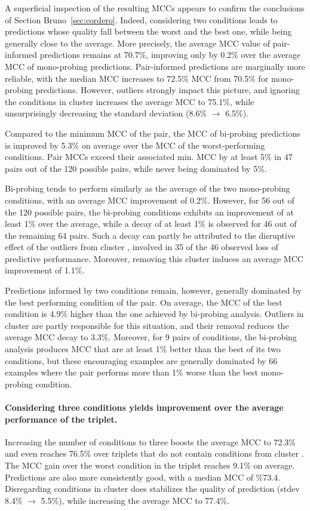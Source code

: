 \documentclass[a4,center,fleqn]{NAR}
\begin{document}
A superficial inspection of the resulting MCCs appears to confirm the conclusions of Section Bruno~\ref{sec:cordero}. Indeed, considering two conditions leads to predictions whose quality fall between the worst and the best one, while being generally close to the average. More precisely, the average MCC value of pair-informed predictions remains at 70.7\%, improving only by 0.2\% over the average MCC of mono-probing predictions. Pair-informed predictions are marginally more reliable, with the median MCC increases to 72.5\% MCC from 70.5\% for mono-probing predictions. However, outliers strongly impact this picture, and ignoring the conditions in cluster  increases the average MCC to 75.1\%, while unsurprisingly decreasing the standard deviation (8.6\% $\to$ 6.5\%).

Compared to the minimum MCC of the pair, the MCC of bi-probing predictions is improved by 5.3\% on average over the MCC of the worst-performing conditions. Pair MCCs exceed their associated min. MCC by at least 5\% in 47 pairs out of the 120 possible pairs, while never being dominated by 5\%. 

Bi-probing tends to perform similarly as the average of the two mono-probing conditions, with an average MCC improvement of 0.2\%. However, for 56 out of the 120 possible pairs, the bi-probing conditions exhibits an improvement of at least 1\% over the average, while a decay of at least 1\% is observed for 46 out of the remaining 64 pairs. Such a decay can partly be attributed to the disruptive effect of the outliers from cluster , involved in 35 of the 46 observed loss of predictive performance. Moreover, removing this cluster induces an average MCC improvement of 1.1\%.

Predictions informed by two conditions remain, however, generally dominated by the best performing condition of the pair. On average, the MCC of the best condition is 4.9\% higher than the one achieved by bi-probing analysis. 
Outliers in cluster  are partly responsible for this situation, and their removal reduces the average MCC decay to 3.3\%. Moreover, for 9 pairs of conditions, the bi-probing analysis produces MCC that are at least 1\% better than the best of its two conditions, but these encouraging examples are generally dominated by 66 examples where the pair performs more than 1\% worse than the best mono-probing condition.

\paragraph{Considering three conditions yields improvement over the average performance of the triplet.}
Increasing the number of conditions to three boosts the average MCC to 72.3\% and even reaches 76.5\% over triplets that do not contain conditions from cluster . The MCC gain over the worst condition in the triplet reaches 9.1\% on average.  Predictions are also more consistently good, with a median MCC of \%73.4. Disregarding conditions in cluster  does stabilizes the quality of prediction (stdev 8.4\% $\to$ 5.5\%), while increasing the average MCC to 77.4\%.
\end{document}
